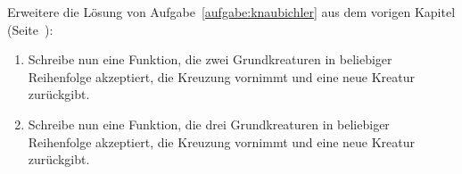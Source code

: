 \begin{aufgabe}
  \label{aufgabe:knaubichler2}
  Erweitere die Lösung von Aufgabe~\ref{aufgabe:knaubichler} aus
  dem vorigen Kapitel (Seite~\pageref{aufgabe:knaubichler}):
  
  \begin{enumerate}
  \item Schreibe nun eine Funktion, die zwei
    Grundkreaturen in beliebiger Reihenfolge akzeptiert, die Kreuzung
    vornimmt und eine neue Kreatur zurückgibt.
    
  \item Schreibe nun eine
    Funktion, die drei Grundkreaturen in beliebiger Reihenfolge
    akzeptiert, die Kreuzung vornimmt und eine neue Kreatur
    zurückgibt.
  \end{enumerate}
\end{aufgabe}     

